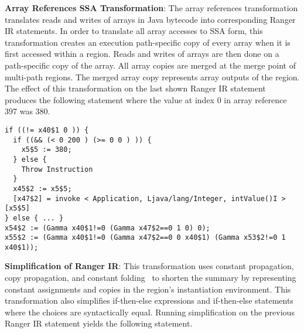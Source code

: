 \textbf{Array References SSA Transformation}: The array references transformation translates reads and writes of arrays in
Java bytecode into corresponding Ranger IR statements.
%
In order to translate all array accesses to SSA form, this transformation creates an execution path-specific copy of
every array when it is first accessed within a region.
%
Reads and writes of arrays are then done on a path-specific copy of the array.
%
All array copies are merged at the merge point of multi-path regions.
%
The merged array copy represents array outputs of the region.
%
The effect of this transformation on the last shown Ranger IR statement produces the following statement where the
value at index 0 in array reference 397 was 380.
\begin{lstlisting}
if ((!= x40$1 0 )) {
  if ((&& (< 0 200 ) (>= 0 0 ) )) {
    x5$5 := 380;
  } else {
    Throw Instruction
  }
  x45$2 := x5$5;
  [x47$2] = invoke < Application, Ljava/lang/Integer, intValue()I >[x5$5]
} else { ... }
x54$2 := (Gamma x40$1!=0 (Gamma x47$2==0 1 0) 0);
x55$2 := (Gamma x40$1!=0 (Gamma x47$2==0 0 x40$1) (Gamma x53$2!=0 1 x40$1));
\end{lstlisting}
%
\textbf{Simplification of Ranger IR}: This transformation uses constant propagation, copy propagation, and constant
folding~\cite{dragon-book} to shorten the summary by representing constant assignments and copies
in the region\rq s instantiation environment.
%
This transformation also simplifies if-then-else expressions and if-then-else statements where the choices are
syntactically equal.
%
Running simplification on the previous Ranger IR statement yields the following statement.
